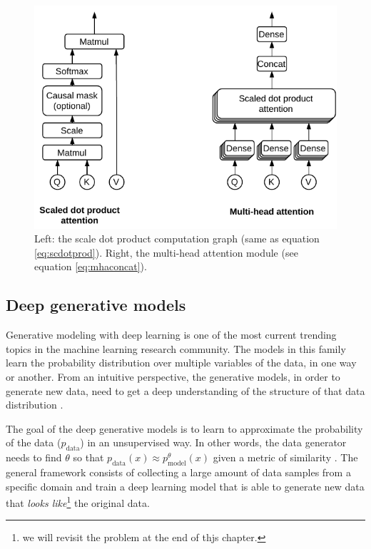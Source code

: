 \begin{figure}
	\centering
	\includegraphics[width=0.85\linewidth]{chapter2/images/attention_modules}
	\caption{Left: the scale dot product computation graph (same as equation \ref{eq:scdotprod}). Right, the multi-head attention module (see equation \ref{eq:mhaconcat}).}
	\label{fig:attentionmodules}
\end{figure}

\subsection{Deep generative models} \label{sec:generative}
Generative modeling with deep learning is one of the most current trending topics in the machine learning research community. The models in this family learn the probability distribution over multiple variables of the data, in one way or another. From an intuitive perspective, the generative models, in order to generate new data, need to get a deep understanding of the structure of that data distribution \autocite{Goodfellow2016}.

The goal of the deep generative models is to learn to approximate the probability of the data ($p_\mathrm{data}$) in an unsupervised way. In other words, the data generator needs to find $\theta$ so that $p_\mathrm{data}(x) \approx p_\mathrm{model}^\theta(x)$ given a metric of similarity \autocite{Goodfellow2016}. The general framework consists of collecting a large amount of data samples from a specific domain and train a deep learning model that is able to generate new data that \textit{looks like}\footnote{we will revisit the problem at the end of thjs chapter.} the original data.

